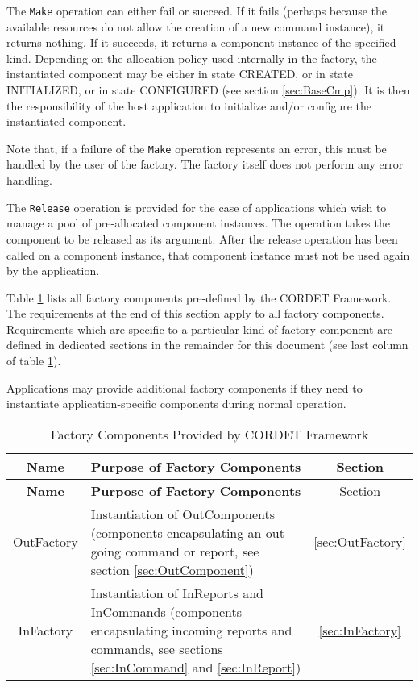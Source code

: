 \documentclass{pnp_article}
\begin{document}
The \texttt{Make} operation can either fail or succeed. If it fails (perhaps because the available resources do not allow the creation of a new command instance), it returns nothing. If it succeeds, it returns a component instance of the specified kind. Depending on the allocation policy used internally in the factory, the instantiated component may be either in state CREATED, or in state INITIALIZED, or in state CONFIGURED (see section \ref{sec:BaseCmp}). It is then the responsibility of the host application to initialize and/or configure the instantiated component.

Note that, if a failure of the \texttt{Make} operation represents an error, this must be handled by the user of the factory. The factory itself does not perform any error handling.

The \texttt{Release} operation is provided for the case of applications which wish to manage a pool of pre-allocated component instances. The operation takes the component to be released as its argument. After the release operation has been called on a component instance, that component instance must not be used again by the application. 

Table \ref{tab:FactoryCmp} lists all factory components pre-defined by the CORDET Framework. The requirements at the end of this section apply to all factory components. 
Requirements which are specific to a particular kind of factory component are defined in dedicated sections in the remainder for this document (see last column of table \ref{tab:FactoryCmp}). 

Applications may provide additional factory components if they need to instantiate application-specific components during normal operation.

\begin{longtable}{|c|p{8cm}|c|}
\caption{Factory Components Provided by CORDET Framework}\label{tab:FactoryCmp} \\
\hline
\rowcolor{light-gray}
\textbf{Name} & \textbf{Purpose of Factory Components} & {Section}\\
\hline\hline
\endfirsthead
\rowcolor{light-gray}
\textbf{Name} & \textbf{Purpose of Factory Components} & {Section}\\
\hline\hline
\endhead
OutFactory & Instantiation of OutComponents (components encapsulating an out-going command or report, see section \ref{sec:OutComponent}) & {\ref{sec:OutFactory}}\\
\hline
InFactory & Instantiation of InReports and InCommands (components encapsulating incoming reports and commands, see sections \ref{sec:InCommand} and \ref{sec:InReport}) & {\ref{sec:InFactory}}\\
\hline
\end{longtable}
 
\end{document}
